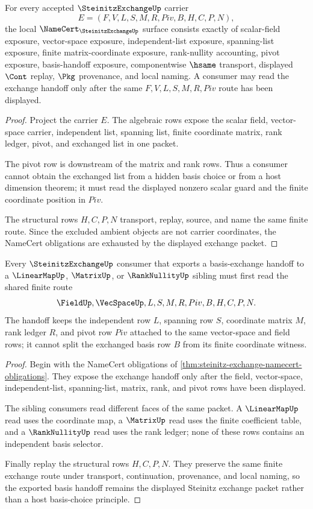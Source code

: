 \begin{theorem}
\label{thm:steinitz-exchange-namecert-obligations}
For every accepted $\SteinitzExchangeUp$ carrier
$$
E=(F,V,L,S,M,R,Piv,B,H,C,P,N),
$$
the local $\NameCert_{\SteinitzExchangeUp}$ surface consists exactly of scalar-field exposure, vector-space exposure, independent-list exposure, spanning-list exposure, finite matrix-coordinate exposure, rank-nullity accounting, pivot exposure, basis-handoff exposure, componentwise $\hsame$ transport, displayed $\Cont$ replay, $\Pkg$ provenance, and local naming. A consumer may read the exchange handoff only after the same $F,V,L,S,M,R,Piv$ route has been displayed.
\end{theorem}
\begin{proof}
Project the carrier $E$. The algebraic rows expose the scalar field, vector-space carrier, independent list, spanning list, finite coordinate matrix, rank ledger, pivot, and exchanged list in one packet.

The pivot row is downstream of the matrix and rank rows. Thus a consumer cannot obtain the exchanged list from a hidden basis choice or from a host dimension theorem; it must read the displayed nonzero scalar guard and the finite coordinate position in $Piv$.

The structural rows $H,C,P,N$ transport, replay, source, and name the same finite route. Since the excluded ambient objects are not carrier coordinates, the NameCert obligations are exhausted by the displayed exchange packet.
\end{proof}

\begin{theorem}
\label{thm:steinitz-exchange-basis-handoff}
Every $\SteinitzExchangeUp$ consumer that exports a basis-exchange handoff to a $\LinearMapUp$, $\MatrixUp$, or $\RankNullityUp$ sibling must first read the shared finite route
$$
\FieldUp,\VecSpaceUp,L,S,M,R,Piv,B,H,C,P,N .
$$
The handoff keeps the independent row $L$, spanning row $S$, coordinate matrix $M$, rank ledger $R$, and pivot row $Piv$ attached to the same vector-space and field rows; it cannot split the exchanged basis row $B$ from its finite coordinate witness.
\end{theorem}
\begin{proof}
Begin with the NameCert obligations of \autoref{thm:steinitz-exchange-namecert-obligations}. They expose the exchange handoff only after the field, vector-space, independent-list, spanning-list, matrix, rank, and pivot rows have been displayed.

The sibling consumers read different faces of the same packet. A $\LinearMapUp$ read uses the coordinate map, a $\MatrixUp$ read uses the finite coefficient table, and a $\RankNullityUp$ read uses the rank ledger; none of these rows contains an independent basis selector.

Finally replay the structural rows $H,C,P,N$. They preserve the same finite exchange route under transport, continuation, provenance, and local naming, so the exported basis handoff remains the displayed Steinitz exchange packet rather than a host basis-choice principle.
\end{proof}

